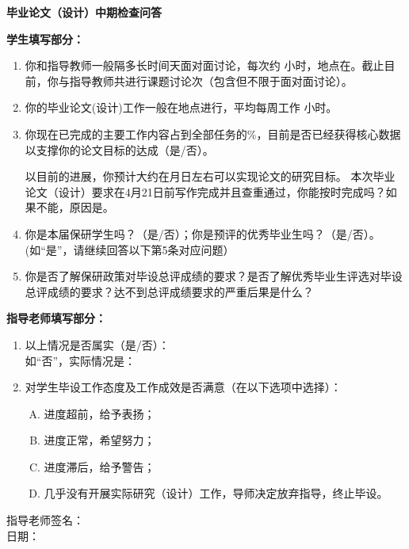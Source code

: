 \pagestyle{empty}
\begin{center}
     \textbf{毕业论文（设计）中期检查问答}
\end{center}
\begin{flushleft}
{\textbf{学生填写部分：}}
\begin{enumerate}
    \item 你和指导教师一般隔多长时间\underline{\makebox[1.5cm]{}}天面对面讨论，每次约 \underline{\makebox[1.5cm]{}}小时，地点在\underline{\makebox[4cm]{}}。截止目前，你与指导教师共进行课题讨论\underline{\makebox[1.5cm]{}}次（包含但不限于面对面讨论）。
    \item 你的毕业论文(设计)工作一般在\underline{\makebox[4cm]{}}地点进行，平均每周工作 \underline{\makebox[1.5cm]{}}小时。
    \item 你现在已完成的主要工作内容占到全部任务的\underline{\makebox[1.5cm]{}}\%，目前是否已经获得核心数据以支撑你的论文目标的达成\underline{\makebox[1.5cm]{}}（是/否）。\par
    \qquad 以目前的进展，你预计大约在\underline{\makebox[1.5cm]{}}月\underline{\makebox[1.5cm]{}}日左右可以实现论文的研究目标。 本次毕业论文（设计）要求在4月21日前写作完成并且查重通过，你能按时完成吗？\underline{\makebox[1.5cm]{}}如果不能，原因是\underline{\makebox[6cm]{}}。      
    \item 你是本届保研学生吗？\underline{\makebox[1.5cm]{}}（是/否）；你是预评的优秀毕业生吗？\underline{\makebox[1.5cm]{}}（是/否）。(如“是”，请继续回答以下第5条对应问题）
    \item 你是否了解保研政策对毕设总评成绩的要求？是否了解优秀毕业生评选对毕设总评成绩的要求？达不到总评成绩要求的严重后果是什么？\\
    \underline{\makebox[\linewidth]{}}
\end{enumerate}
{\textbf{指导老师填写部分：}}
\begin{enumerate}
    \item 以上情况是否属实（是/否）：\underline{\makebox[1.5cm]{}}\\
    如“否”，实际情况是：\underline{\makebox[6cm]{}}             
    \item 对学生毕设工作态度及工作成效是否满意（在以下选项中选择）： \underline{\makebox[1.5cm]{}}        
    \begin{enumerate}[A.]
        \item 进度超前，给予表扬；
        \item 进度正常，希望努力；
        \item 进度滞后，给予警告；
        \item 几乎没有开展实际研究（设计）工作，导师决定放弃指导，终止毕设。
    \end{enumerate}
\end{enumerate}
{\hfill {指导老师签名：\underline{\makebox[3cm]{}}}}\\
\hfill 日期：\underline{}
\end{flushleft}
